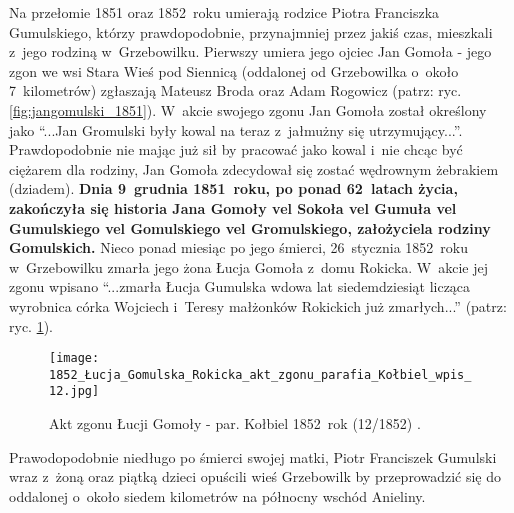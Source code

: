 Na przełomie 1851 oraz 1852~roku umierają rodzice Piotra Franciszka 
Gumulskiego, którzy prawdopodobnie, przynajmniej przez jakiś czas, mieszkali 
z~jego rodziną w~Grzebowilku. Pierwszy umiera jego ojciec Jan Gomoła - jego 
zgon we wsi Stara Wieś pod Siennicą (oddalonej od Grzebowilka o~około 
7~kilometrów) zgłaszają Mateusz Broda oraz Adam Rogowicz (patrz: ryc. 
\ref{fig:jangomulski_1851}). W~akcie swojego zgonu Jan Gomoła został określony 
jako \enquote{...Jan Gromulski były kowal na teraz z~jałmużny się 
utrzymujący...}. Prawdopodobnie nie mając już sił by pracować 
jako kowal i~nie chcąc być ciężarem dla rodziny, Jan Gomoła zdecydował się 
zostać wędrownym żebrakiem (dziadem). \textbf{Dnia 9~grudnia 1851~roku, po 
ponad 62~latach życia, zakończyła się historia Jana Gomoły vel Sokoła vel 
Gumuła vel Gumulskiego vel Gomulskiego vel Gromulskiego, założyciela rodziny 
Gomulskich.} Nieco ponad miesiąc po jego śmierci, 26~stycznia 1852~roku 
w~Grzebowilku zmarła jego żona Łucja Gomoła z~domu Rokicka. W~akcie jej zgonu 
wpisano \enquote{...zmarła Łucja Gumulska wdowa lat siedemdziesiąt licząca 
wyrobnica córka Wojciech i~Teresy małżonków Rokickich już zmarłych...} 
(patrz: ryc. \ref{fig:lgomola_1852}).

\begin{figure}[!ht]
    \vspace*{0.5cm}
    \centering \texttt{[image: 
        1852\_Łucja\_Gomulska\_Rokicka\_akt\_zgonu\_parafia\_Kołbiel\_wpis\_12.jpg]}
    \captionsetup{format=hang}
    \caption{Akt zgonu Łucji Gomoły - par. Kołbiel 1852~rok (12/1852) 
    \cite{par_kolbiel2}.}
    \label{fig:lgomola_1852}
\end{figure}

Prawodopodobnie niedługo po śmierci swojej matki, Piotr Franciszek Gumulski 
wraz z~żoną oraz piątką dzieci opuścili wieś Grzebowilk by przeprowadzić się 
do oddalonej o~około siedem kilometrów na północny wschód Anieliny.